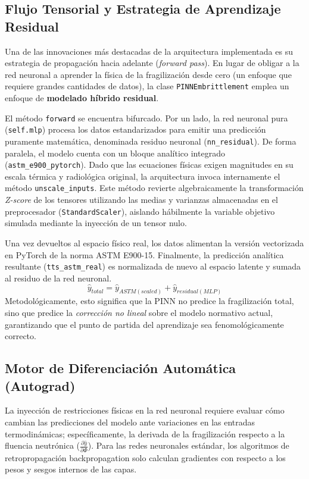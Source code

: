 \documentclass[a4paper, 12pt, twocolumn]{book}
\begin{document}
\subsection{Flujo Tensorial y Estrategia de Aprendizaje Residual}

Una de las innovaciones más destacadas de la arquitectura implementada es su estrategia de propagación hacia adelante (\textit{forward pass}). En lugar de obligar a la red neuronal a aprender la física de la fragilización desde cero (un enfoque que requiere grandes cantidades de datos), la clase \texttt{PINNEmbrittlement} emplea un enfoque de \textbf{modelado híbrido residual}.

El método \texttt{forward} se encuentra bifurcado. Por un lado, la red neuronal pura (\texttt{self.mlp}) procesa los datos estandarizados para emitir una predicción puramente matemática, denominada residuo neuronal (\texttt{nn\_residual}). De forma paralela, el modelo cuenta con un bloque analítico integrado (\texttt{astm\_e900\_pytorch}). Dado que las ecuaciones físicas exigen magnitudes en su escala térmica y radiológica original, la arquitectura invoca internamente el método \texttt{unscale\_inputs}. Este método revierte algebraicamente la transformación \textit{Z-score} de los tensores utilizando las medias y varianzas almacenadas en el preprocesador (\texttt{StandardScaler}), aislando hábilmente la variable objetivo simulada mediante la inyección de un tensor nulo.

Una vez devueltos al espacio físico real, los datos alimentan la versión vectorizada en PyTorch de la norma ASTM E900-15. Finalmente, la predicción analítica resultante (\texttt{tts\_astm\_real}) es normalizada de nuevo al espacio latente y sumada al residuo de la red neuronal. 
\begin{equation}
    \hat{y}_{total} = \hat{y}_{ASTM (scaled)} + \hat{y}_{residual (MLP)}
\end{equation}
Metodológicamente, esto significa que la PINN no predice la fragilización total, sino que predice la \textit{corrección no lineal} sobre el modelo normativo actual, garantizando que el punto de partida del aprendizaje sea fenomológicamente correcto.

\subsection{Motor de Diferenciación Automática (Autograd)}

La inyección de restricciones físicas en la red neuronal requiere evaluar cómo cambian las predicciones del modelo ante variaciones en las entradas termodinámicas; específicamente, la derivada de la fragilización respecto a la fluencia neutrónica ($\frac{\partial \hat{y}}{\partial \Phi}$). Para las redes neuronales estándar, los algoritmos de retropropagación backpropagation solo calculan gradientes con respecto a los pesos y sesgos internos de las capas.
\end{document}
